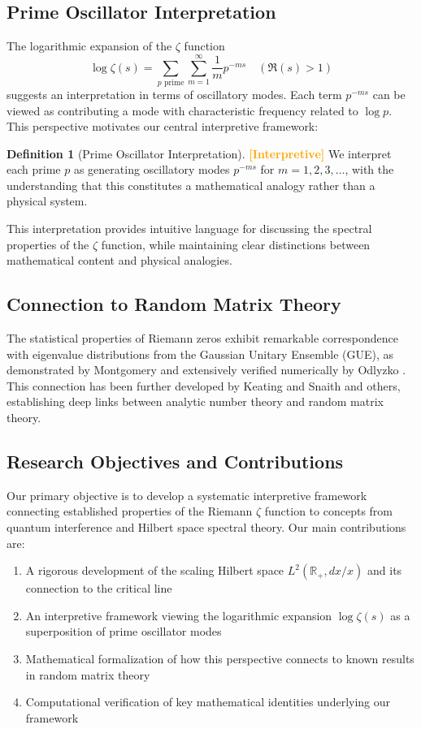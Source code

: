 \documentclass[12pt]{article}
\theoremstyle{plain}
\theoremstyle{definition}
\newtheorem{definition}[theorem]{Definition}
\newcommand{\statusinterp}{\textcolor{orange}{\textbf{[Interpretive]}}}
\begin{document}
\subsection{Prime Oscillator Interpretation}

The logarithmic expansion of the $\zeta$ function
$$
\log\zeta(s) = \sum_{p \text{ prime}}\sum_{m=1}^{\infty} \frac{1}{m} p^{-ms} \quad (\Re(s) > 1)
$$
suggests an interpretation in terms of oscillatory modes. Each term $p^{-ms}$ can be viewed as contributing a mode with characteristic frequency related to $\log p$. This perspective motivates our central interpretive framework:

\begin{definition}[Prime Oscillator Interpretation] \statusinterp
We interpret each prime $p$ as generating oscillatory modes $p^{-ms}$ for $m = 1, 2, 3, \ldots$, with the understanding that this constitutes a mathematical analogy rather than a physical system.
\end{definition}

This interpretation provides intuitive language for discussing the spectral properties of the $\zeta$ function, while maintaining clear distinctions between mathematical content and physical analogies.

\subsection{Connection to Random Matrix Theory}

The statistical properties of Riemann zeros exhibit remarkable correspondence with eigenvalue distributions from the Gaussian Unitary Ensemble (GUE), as demonstrated by Montgomery \cite{montgomery1973} and extensively verified numerically by Odlyzko \cite{odlyzko1987}. This connection has been further developed by Keating and Snaith \cite{keating-snaith2000} and others, establishing deep links between analytic number theory and random matrix theory.

\subsection{Research Objectives and Contributions}

Our primary objective is to develop a systematic interpretive framework connecting established properties of the Riemann $\zeta$ function to concepts from quantum interference and Hilbert space spectral theory. Our main contributions are:

\begin{enumerate}
\item A rigorous development of the scaling Hilbert space $L^2(\mathbb{R}_+, dx/x)$ and its connection to the critical line
\item An interpretive framework viewing the logarithmic expansion $\log\zeta(s)$ as a superposition of prime oscillator modes
\item Mathematical formalization of how this perspective connects to known results in random matrix theory
\item Computational verification of key mathematical identities underlying our framework
\end{enumerate}
\end{document}
